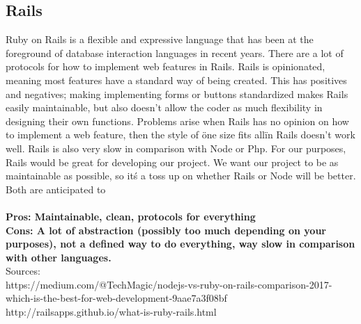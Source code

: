 \documentclass[draftclsnofoot,onecolumn,letterpaper,10pt,compsoc]{IEEEtran}
\begin{document}
	\subsection{Rails}
		Ruby on Rails is a flexible and expressive language that has been at the foreground of database interaction languages in recent years.
		There are a lot of protocols for how to implement web features in Rails. Rails is opinionated, meaning most features have a standard way of being created.
		This has positives and negatives; making implementing forms or buttons standardized makes Rails easily maintainable, but also doesn't allow the coder as much flexibility in designing their own functions.
		Problems arise when Rails has no opinion on how to implement a web feature, then the style of \"one size fits all\" in Rails doesn't work well. Rails is also very slow in comparison with Node or Php.
		For our purposes, Rails would be great for developing our project.
		We want our project to be as maintainable as possible, so it\'s a toss up on whether Rails or Node will be better.
		Both are anticipated to
		\\ \\
		\textbf{Pros: Maintainable, clean, protocols for everything}
		\\
		\textbf{Cons: A lot of abstraction (possibly too much depending on your purposes), not a defined way to do everything, way slow in comparison with other languages.}
		\\
		Sources: \\
		https://medium.com/@TechMagic/nodejs-vs-ruby-on-rails-comparison-2017-which-is-the-best-for-web-development-9aae7a3f08bf \\
		http://railsapps.github.io/what-is-ruby-rails.html \\ \\
\end{document}
